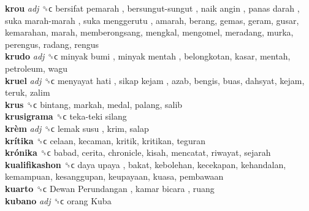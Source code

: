 \textbf{krou} \emph{adj}  ␝ϲ   bersifat pemarah ,  bersungut-sungut ,  naik angin ,  panas darah ,  suka marah-marah ,  suka menggerutu , amarah, berang, gemas, geram, gusar, kemarahan, marah, memberongsang, mengkal, mengomel, meradang, murka, perengus, radang, rengus  \\
\textbf{krudo} \emph{adj}  ␝ϲ   minyak bumi ,  minyak mentah , belongkotan, kasar, mentah, petroleum, wagu  \\
\textbf{kruel} \emph{adj}  ␝ϲ   menyayat hati ,  sikap kejam , azab, bengis, buas, dahsyat, kejam, teruk, zalim  \\
\textbf{krus} ␝ϲ  bintang, markah, medal, palang, salib  \\
\textbf{krusigrama} ␝ϲ   teka-teki silang   \\
\textbf{krèm} \emph{adj}  ␝ϲ   lemak susu , krim, salap  \\
\textbf{krítika} ␝ϲ  celaan, kecaman, kritik, kritikan, teguran  \\
\textbf{krónika} ␝ϲ  babad, cerita, chronicle, kisah, mencatat, riwayat, sejarah  \\
\textbf{kualifikashon} ␝ϲ   daya upaya , bakat, kebolehan, kecekapan, kehandalan, kemampuan, kesanggupan, keupayaan, kuasa, pembawaan  \\
\textbf{kuarto} ␝ϲ   Dewan Perundangan ,  kamar bicara , ruang  \\
\textbf{kubano} \emph{adj}  ␝ϲ   orang Kuba   \\
